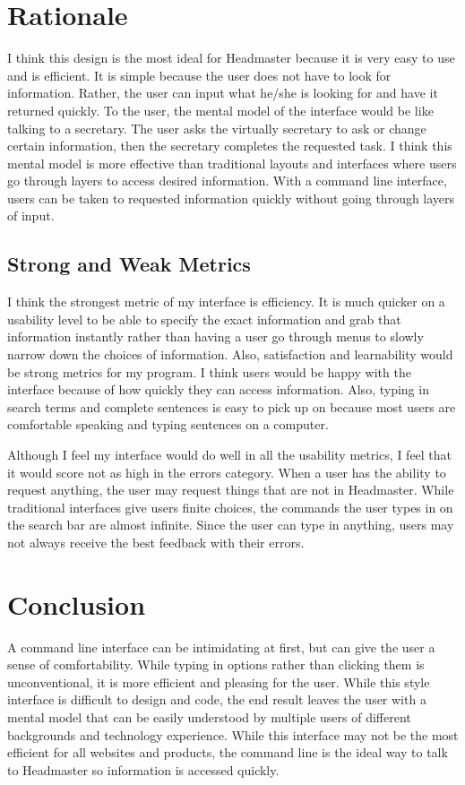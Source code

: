 \documentclass{article}
\begin{document}
\section{Rationale}

I think this design is the most ideal for Headmaster because it is very easy to use and is efficient. It is simple because the user does not have to look for information. Rather, the user can input what he/she is looking for and have it returned quickly. To the user, the mental model of the interface would be like talking to a secretary. The user asks the virtually secretary to ask or change certain information, then the secretary completes the requested task. I think this mental model is more effective than traditional layouts and interfaces where users go through layers to access desired information. With a command line interface, users can be taken to requested information quickly without going through layers of input. 


\subsection{Strong and Weak Metrics}
	I think the strongest metric of my interface is efficiency. It is much quicker on a usability level to be able to specify the exact information and grab that information instantly rather than having a user go through menus to slowly narrow down the choices of information. Also, satisfaction and learnability would be strong metrics for my program. I think users would be happy with the interface because of how quickly they can access information. Also, typing in search terms and complete sentences is easy to pick up on because most users are comfortable speaking and typing sentences on a computer. 
	
	Although I feel my interface would do well in all the usability metrics, I feel that it would score not as high in the errors category. When a user has the ability to request anything, the user may request things that are not in Headmaster. While traditional interfaces give users finite choices, the commands the user types in on the search bar are almost infinite. Since the user can type in anything, users may not always receive the best feedback with their errors.


\section{Conclusion}

	A command line interface can be intimidating at first, but can give the user a sense of comfortability. While typing in options rather than clicking them is unconventional, it is more efficient and pleasing for the user. While this style interface is difficult to design and code, the end result leaves the user with a mental model that can be easily understood by multiple users of different backgrounds and technology experience. While this interface may not be the most efficient for all websites and products, the command line is the ideal way to talk to Headmaster so information is accessed quickly.
	
\pagebreak


\end{document}
